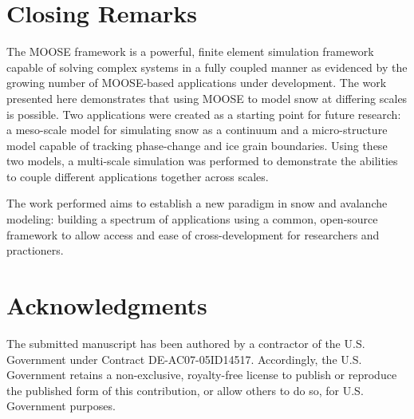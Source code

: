\section{Closing Remarks}
The MOOSE framework is a powerful, finite element simulation framework capable of solving complex systems in a fully coupled manner as evidenced by the growing number of MOOSE-based applications under development. The work presented here demonstrates that using MOOSE to model snow at differing scales is possible. Two applications were created as a starting point for future research: a meso-scale model for simulating snow as a continuum and a micro-structure model capable of tracking phase-change and ice grain boundaries. Using these two models, a multi-scale simulation was performed to demonstrate the abilities to couple different applications together across scales.

The work performed aims to establish a new paradigm in snow and avalanche modeling: building a spectrum of applications using a common, open-source framework to allow access and ease of cross-development for researchers and practioners.


\section{Acknowledgments}
The submitted manuscript has been authored by a contractor of the
U.S. Government under Contract DE-AC07-05ID14517. Accordingly, the
U.S. Government retains a non-exclusive, royalty-free license to
publish or reproduce the published form of this contribution, or allow
others to do so, for U.S. Government purposes.
